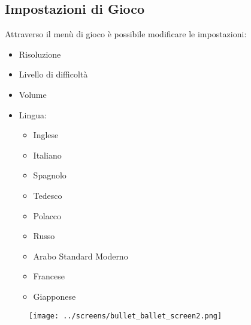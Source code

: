\begin{comment}
\begin{figure}[H]
	\centering{}
	\texttt{[image: ../screens/bullet\_ballet\_screen5.png]}
	\label{img:bullet_ballet_screen5}
\end{figure}
\end{comment}

\subsection{Impostazioni di Gioco}

\textsf{\small Attraverso il menù di gioco è possibile modificare le impostazioni: } \\

\begin{itemize}
	\item \textsf{\small Risoluzione}
	\item \textsf{\small Livello di difficoltà}
	\item \textsf{\small Volume}
	\item \textsf{\small Lingua:}
	\begin{itemize}
		\item \textsf{\small Inglese}
		\item \textsf{\small Italiano}
		\item \textsf{\small Spagnolo}
		\item \textsf{\small Tedesco}
		\item \textsf{\small Polacco}
		\item \textsf{\small Russo}
		\item \textsf{\small Arabo Standard Moderno}
		\item \textsf{\small Francese}
		\item \textsf{\small Giapponese}
	\end{itemize}
\end{itemize}

\begin{figure}[H]
	\centering{}
	\texttt{[image: ../screens/bullet\_ballet\_screen2.png]}
	\label{img:bullet_ballet_screen2}
\end{figure}

\begin{comment}
\begin{figure}[H]
	\centering{}
	\texttt{[image: ../screens/bullet\_ballet\_screen6.png]}
	\label{img:bullet_ballet_screen6}
\end{figure}
\end{comment}


